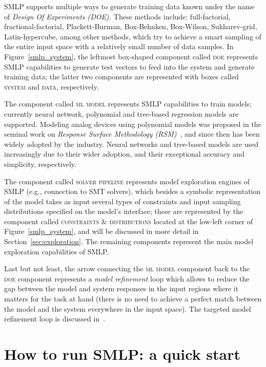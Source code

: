 \documentclass[a4paper,parskip=half]{article} %
\begin{document}
SMLP supports multiple ways to generate training data known under the name of \emph{Design Of Experiments (DOE).}
These methods include: full-factorial, fractional-factorial, Plackett-Burman, Box-Behnken, Box-Wilson, Sukharev-grid, Latin-hypercube, 
among other methods, which try to achieve a smart sampling of the entire input space with a relatively small number of data samples.
In Figure~\ref{smlp_system}, the leftmost box-shaped component called \textsc{doe} represents SMLP capabilities to generate test 
vectors to feed into the system and generate training data; the latter two components are represented with boxes 
called \textsc{system} and \textsc{data}, respectively. 

The component called \textsc{ml model} represents SMLP capabilities to train models; currently neural network, polynomial 
and tree-based  regression models are supported. Modeling analog devices using polynomial models was proposed in the 
seminal work on \emph{Response Surface Methodology (RSM)}~\cite{51647df2-9154-322e-85ba-aa565c9e550a},
and since then has been widely adopted by the industry. Neural networks and tree-based models are used increasingly due to 
their wider adoption, and their exceptional accuracy and simplicity, respectively.

The component called \textsc{solver pipeline} represents model exploration engines of SMLP (e.g., connection to SMT solvers), 
which besides a symbolic representation of the model takes as input several types of constraints and input sampling distributions 
specified on the model's interface; these are represented by the component called \textsc{constraints \& distributions} 
located at the low-left corner of  Figure~\ref{smlp_system}, and will be discussed in more detail in Section~\ref{sec:exploration}.
The remaining components represent the main model exploration capabilities of SMLP. 

Last but not least, the arrow connecting the \textsc{ml model} component back to the \textsc{doe} component represents a
\emph{model refinement} loop which allows to reduce the gap between the model and system responses in the input regions
where it matters for the task at hand (there is no need to achieve a perfect match between the model and the system 
everywhere in the input space). The targeted model refinement loop is discussed in~.



\section{How to run SMLP: a quick start}\label{sec:example}
\end{document}
